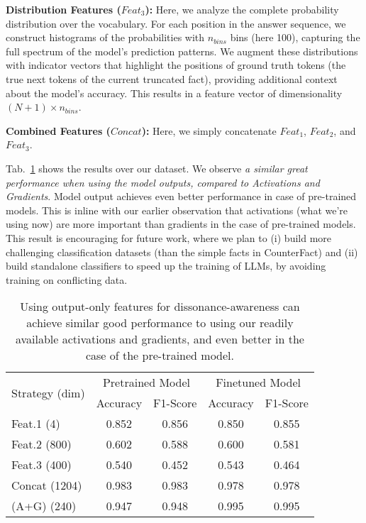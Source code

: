 \noindent \textbf{Distribution Features ($Feat_3$):} Here, we analyze the complete probability distribution over the vocabulary. For each position in the answer sequence, we construct histograms of the probabilities with $n_{bins}$ bins (here 100), capturing the full spectrum of the model's prediction patterns. We augment these distributions with indicator vectors that highlight the positions of ground truth tokens (the true next tokens of the current truncated fact), providing additional context about the model's accuracy. This  results in a feature vector of dimensionality $(N + 1) \times n_{bins}$.

\noindent \textbf{Combined Features ($Concat$):} Here, we simply concatenate $Feat_1$, $Feat_2$, and $Feat_3$. 

Tab.~\ref{tab:output:prob} shows the results over our dataset. We observe \textit{a similar great performance when using the model outputs, compared to Activations and Gradients}. Model output achieves even better performance in case of pre-trained models. This is inline with our earlier observation that activations (what we're using now) are more important than gradients in the case of pre-trained models. This result is encouraging for future work, where we plan to (i) build more challenging classification datasets (than the simple facts in CounterFact) and (ii) build standalone classifiers to speed up the training of LLMs, by avoiding training on conflicting data.

\begin{table}[h]
\centering
\begin{tabular}{l|cc|cc}
\toprule
\multirow{2}{*}{Strategy (dim)} & \multicolumn{2}{c|}{Pretrained Model} & \multicolumn{2}{c}{Finetuned Model} \\
 & Accuracy & F1-Score & Accuracy & F1-Score \\
\midrule
Feat.1 (4) & 0.852 & 0.856 & 0.850 & 0.855 \\
Feat.2 (800) & 0.602 & 0.588 & 0.600 & 0.581 \\
Feat.3 (400) & 0.540 & 0.452 & 0.543 & 0.464 \\
Concat (1204) & 0.983 & 0.983 & 0.978 & 0.978 \\
(A+G) (240) & 0.947 & 0.948 & 0.995 & 0.995 \\
\bottomrule
\end{tabular}
\caption{Using output-only features for dissonance-awareness can achieve similar good performance to using our readily available activations and gradients, and even better in the case of the pre-trained model.}\label{tab:output:prob}
\end{table}

